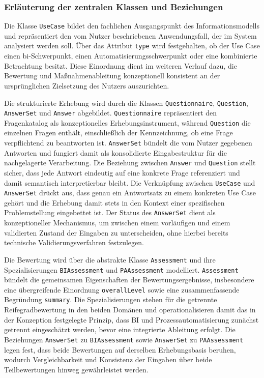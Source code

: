\subsubsection{Erläuterung der zentralen Klassen und Beziehungen}
Die Klasse \texttt{UseCase} bildet den fachlichen Ausgangspunkt des Informationsmodells und repräsentiert den vom Nutzer beschriebenen Anwendungsfall, der im System analysiert werden soll. Über das Attribut \texttt{type} wird festgehalten, ob der Use Case einen \gls{bi}-Schwerpunkt, einen Automatisierungsschwerpunkt oder eine kombinierte Betrachtung besitzt. Diese Einordnung dient im weiteren Verlauf dazu, die Bewertung und Maßnahmenableitung konzeptionell konsistent an der ursprünglichen Zielsetzung des Nutzers auszurichten.

Die strukturierte Erhebung wird durch die Klassen \texttt{Questionnaire}, \texttt{Question}, \texttt{AnswerSet} und \texttt{Answer} abgebildet. \texttt{Questionnaire} repräsentiert den Fragenkatalog als konzeptionelles Erhebungsinstrument, während \texttt{Question} die einzelnen Fragen enthält, einschließlich der Kennzeichnung, ob eine Frage verpflichtend zu beantworten ist. \texttt{AnswerSet} bündelt die vom Nutzer gegebenen Antworten und fungiert damit als konsolidierte Eingabestruktur für die nachgelagerte Verarbeitung. Die Beziehung zwischen \texttt{Answer} und \texttt{Question} stellt sicher, dass jede Antwort eindeutig auf eine konkrete Frage referenziert und damit semantisch interpretierbar bleibt. Die Verknüpfung zwischen \texttt{UseCase} und \texttt{AnswerSet} drückt aus, dass genau ein Antwortsatz zu einem konkreten Use Case gehört und die Erhebung damit stets in den Kontext einer spezifischen Problemstellung eingebettet ist. Der Status des \texttt{AnswerSet} dient als konzeptioneller Mechanismus, um zwischen einem vorläufigen und einem validierten Zustand der Eingaben zu unterscheiden, ohne hierbei bereits technische Validierungsverfahren festzulegen.

Die Bewertung wird über die abstrakte Klasse \texttt{Assessment} und ihre Spezialisierungen \texttt{BIAssessment} und \texttt{PAAssessment} modelliert. \texttt{Assessment} bündelt die gemeinsamen Eigenschaften der Bewertungsergebnisse, insbesondere eine übergreifende Einordnung \texttt{overallLevel} sowie eine zusammenfassende Begründung \texttt{summary}. Die Spezialisierungen stehen für die getrennte Reifegradbewertung in den beiden Domänen und operationalisieren damit das in der Konzeption festgelegte Prinzip, dass BI und Prozessautomatisierung zunächst getrennt eingeschätzt werden, bevor eine integrierte Ableitung erfolgt. Die Beziehungen \texttt{AnswerSet} zu \texttt{BIAssessment} sowie \texttt{AnswerSet} zu \texttt{PAAssessment} legen fest, dass beide Bewertungen auf derselben Erhebungsbasis beruhen, wodurch Vergleichbarkeit und Konsistenz der Eingaben über beide Teilbewertungen hinweg gewährleistet werden.

